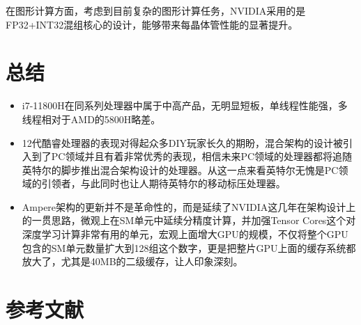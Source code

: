 \documentclass[a4paper]{article}
\begin{document}
在图形计算方面，考虑到目前复杂的图形计算任务，NVIDIA采用的是FP32+INT32混组核心的设计，能够带来每晶体管性能的显著提升。

\section{总结}
\begin{itemize}
	\item i7-11800H在同系列处理器中属于中高产品，无明显短板，单线程性能强，多线程相对于AMD的5800H略差。
	\item 12代酷睿处理器的表现对得起众多DIY玩家长久的期盼，混合架构的设计被引入到了PC领域并且有着非常优秀的表现，相信未来PC领域的处理器都将追随英特尔的脚步推出混合架构设计的处理器。从这一点来看英特尔无愧是PC领域的引领者，与此同时也让人期待英特尔的移动标压处理器。
	\item Ampere架构的更新并不是革命性的，而是延续了NVIDIA这几年在架构设计上的一贯思路，微观上在SM单元中延续分精度计算，并加强Tensor Cores这个对深度学习计算非常有用的单元，宏观上面增大GPU的规模，不仅将整个GPU包含的SM单元数量扩大到128组这个数字，更是把整片GPU上面的缓存系统都放大了，尤其是40MB的二级缓存，让人印象深刻。

\end{itemize}


\newpage
\section{参考文献}
\cite{CPU1}\cite{CPU2}\cite{CPU3}\cite{GPU1}\cite{GPU2}\cite{GPU3}\cite{GPU4}


\end{document}
